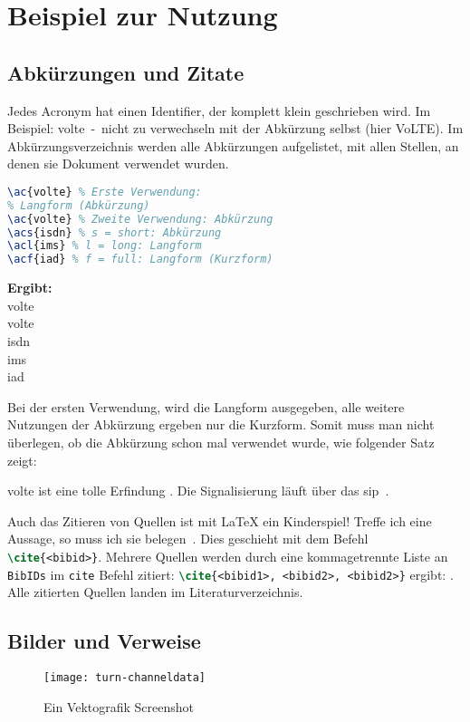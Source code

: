 \chapter{Beispiel zur Nutzung}
\section{Abkürzungen und Zitate}
Jedes Acronym hat einen Identifier, der komplett klein geschrieben wird. Im Beispiel: volte~-~nicht zu verwechseln mit der Abkürzung selbst (hier VoLTE). Im Abkürzungsverzeichnis werden alle Abkürzungen aufgelistet, mit allen Stellen, an denen sie Dokument verwendet wurden. 

\begin{minipage}{.6\textwidth}
\begin{lstlisting}[language=latex]
\ac{volte} % Erste Verwendung: 
% Langform (Abkürzung)
\ac{volte} % Zweite Verwendung: Abkürzung
\acs{isdn} % s = short: Abkürzung
\acl{ims} % l = long: Langform
\acf{iad} % f = full: Langform (Kurzform)
\end{lstlisting}   
\end{minipage}
\begin{minipage}{.4\textwidth}
	\footnotesize
	\textbf{Ergibt:}\\
	\ac{volte}\\
	\ac{volte}\\
	\acs{isdn}\\
	\acl{ims}\\
	\acf{iad} 
\end{minipage}

Bei der ersten Verwendung, wird die Langform ausgegeben, alle weitere Nutzungen der Abkürzung ergeben nur die Kurzform. Somit muss man nicht überlegen, ob die Abkürzung schon mal verwendet wurde, wie folgender Satz zeigt: 

\Ac{volte} ist eine tolle Erfindung \cite{3GPP.TS.24.228.v5.15.0}. Die Signalisierung läuft über das \ac{sip}~\cite{rfc3261}.

Auch das Zitieren von Quellen ist mit \LaTeX{} ein Kinderspiel! Treffe ich eine Aussage, so muss ich sie belegen~\cite{rfc2693}. Dies geschieht mit dem Befehl \lstinline[language=latex]|\cite{<bibid>}|. Mehrere Quellen werden durch eine kommagetrennte Liste an \texttt{BibIDs} im \texttt{cite} Befehl zitiert: \lstinline[language=latex]|\cite{<bibid1>, <bibid2>, <bibid2>}| ergibt: \cite{rfc1, rfc1754, rfc1971}. Alle zitierten Quellen landen im Literaturverzeichnis.
\section{Bilder und Verweise}
\begin{figure}[ht]
	\centering
	\texttt{[image: turn-channeldata]}
	\caption{Ein Vektografik Screenshot}
	\label{fig:turn-channeldata}
\end{figure}

